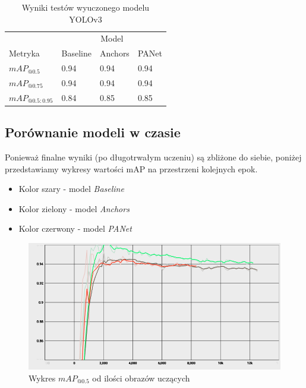 \documentclass{article}
\begin{document}
\begin{table}
	\caption{Wyniki testów wyuczonego modelu YOLOv3}
	\centering
	\begin{tabular}{llll}
		\toprule
		& \multicolumn{3}{c}{Model}                   \\
		\cmidrule(r){2-4}
            Metryka & Baseline & Anchors & PANet \\
		\midrule
		\(mAP_{@0.5}\)      & 0.94 & 0.94 & 0.94 \\
		\(mAP_{@0.75}\)     & 0.94 & 0.94 & 0.94 \\
		\(mAP_{@0.5:0.95}\) & 0.84 & 0.85 & 0.85 \\
		\bottomrule
	\end{tabular}
	\label{tab:results}
\end{table}

\FloatBarrier

\subsection{Porównanie modeli w czasie}

Ponieważ finalne wyniki (po długotrwałym uczeniu) są zbliżone do siebie, poniżej przedstawiamy wykresy wartości mAP na przestrzeni kolejnych epok.

\begin{itemize}
    \item Kolor szary - model \textit{Baseline}
    \item Kolor zielony - model \textit{Anchors}
    \item Kolor czerwony - model \textit{PANet}
\end{itemize}

\begin{figure}[!h]
    \centering \includegraphics[width=1\linewidth]{map_0_5}
    \caption{Wykres $mAP_{@0.5}$ od ilości obrazów uczących}
    \label{fig:map_0_5}
\end{figure}
\end{document}
